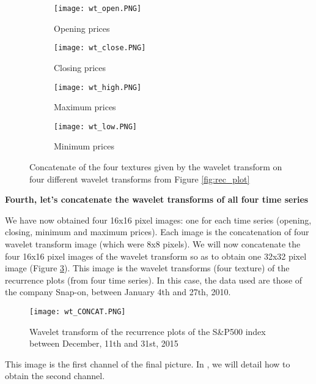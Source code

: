 \documentclass[11pt]{article}
\begin{document}
\begin{onehalfspace}
\begin{figure}[h!]
    \centering
    \captionsetup{justification=centering}
    \begin{subfigure}{0.24\textwidth}
        \texttt{[image: wt\_open.PNG]}
        \caption{Opening prices}
        \label{fig:open_concat}
    \end{subfigure}
    \begin{subfigure}{0.24\textwidth}
        \texttt{[image: wt\_close.PNG]}
        \caption{Closing prices}
    \end{subfigure}
    \begin{subfigure}{0.24\textwidth}
        \texttt{[image: wt\_high.PNG]}
        \caption{Maximum prices}
    \end{subfigure}    
    \begin{subfigure}{0.24\textwidth}
        \texttt{[image: wt\_low.PNG]}
        \caption{Minimum prices}
    \end{subfigure}
    \caption{Concatenate of the four textures given by the wavelet transform on four different wavelet transforms from Figure \ref{fig:rec_plot}}
    \label{fig:wave_concat}
\end{figure}

\noindent \textbf{Fourth, let's concatenate the wavelet transforms of all four time series }

We have now obtained four 16x16 pixel images: one for each time series (opening, closing, minimum and maximum prices). Each image is the concatenation of four wavelet transform image (which were 8x8 pixels). We will now concatenate the four 16x16 pixel images of the wavelet transform so as to obtain one 32x32 pixel image (Figure \ref{fig:wt}). This image is the wavelet transforms (four texture) of the recurrence plots (from four time series). In this case, the data used are those of the company Snap-on, between January 4th and 27th, 2010. 

\begin{figure}[h!]
     \centering
     \captionsetup{justification=centering}
     \texttt{[image: wt\_CONCAT.PNG]}
     \caption{Wavelet transform of the recurrence plots of the S\&P500 index between December, 11th and 31st, 2015}
\label{fig:wt}
\end{figure}

This image is the first channel of the final picture. In , we will detail how to obtain the second channel.


\end{onehalfspace}
\end{document}
